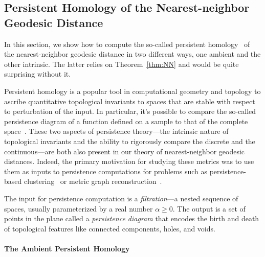 \subsection{Persistent Homology of the Nearest-neighbor Geodesic Distance}
  \label{sec:persistence}

% 
  In this section, we show how to compute the so-called persistent homology~\cite{edelsbrunner02topological} of the nearest-neighbor geodesic distance in two different ways, one ambient and the other intrinsic.
  The latter relies on Theorem~\ref{thm:NN} and would be quite surprising without it.

  Persistent homology is a popular tool in computational geometry and topology to ascribe quantitative topological invariants to spaces that are stable with respect to perturbation of the input.
  In particular, it's possible to compare the so-called persistence diagram of a function defined on a sample to that of the complete space~\cite{chazal08towards}.
  These two aspects of persistence theory---the intrinsic nature of topological invariants and the ability to rigorously compare the discrete and the continuous---are both also present in our theory of nearest-neighbor geodesic distances.
  Indeed, the primary motivation for studying these metrics was to use them as inputs to persistence computations for problems such as persistence-based clustering~\cite{chazal13persistence} or metric graph reconstruction~\cite{aanjaneya12metric}.

  The input for persistence computation is a \emph{filtration}---a nested sequence of spaces, usually parameterized by a real number $\alpha\ge 0$.
  The output is a set of points in the plane called a \emph{persistence diagram} that encodes the birth and death of topological features like connected components, holes, and voids.

  \paragraph*{The Ambient Persistent Homology}

